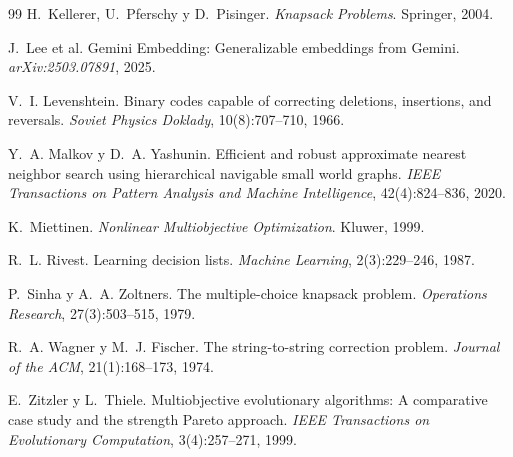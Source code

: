 \begin{thebibliography}{99}
H.~Kellerer, U.~Pferschy y D.~Pisinger.
\newblock \emph{Knapsack Problems}.
\newblock Springer, 2004.

J.~Lee et al.
\newblock Gemini Embedding: Generalizable embeddings from Gemini.
\newblock \emph{arXiv:2503.07891}, 2025.

V.~I. Levenshtein.
\newblock Binary codes capable of correcting deletions, insertions, and
  reversals.
\newblock \emph{Soviet Physics Doklady}, 10(8):707--710, 1966.

Y.~A. Malkov y D.~A. Yashunin.
\newblock Efficient and robust approximate nearest neighbor search using
  hierarchical navigable small world graphs.
\newblock \emph{IEEE Transactions on Pattern Analysis and Machine
  Intelligence}, 42(4):824--836, 2020.

K.~Miettinen.
\newblock \emph{Nonlinear Multiobjective Optimization}.
\newblock Kluwer, 1999.

R.~L. Rivest.
\newblock Learning decision lists.
\newblock \emph{Machine Learning}, 2(3):229--246, 1987.

P.~Sinha y A.~A. Zoltners.
\newblock The multiple-choice knapsack problem.
\newblock \emph{Operations Research}, 27(3):503--515, 1979.

R.~A. Wagner y M.~J. Fischer.
\newblock The string-to-string correction problem.
\newblock \emph{Journal of the ACM}, 21(1):168--173, 1974.

E.~Zitzler y L.~Thiele.
\newblock Multiobjective evolutionary algorithms: A comparative case study and
  the strength Pareto approach.
\newblock \emph{IEEE Transactions on Evolutionary Computation}, 3(4):257--271,
  1999.

\end{thebibliography}
